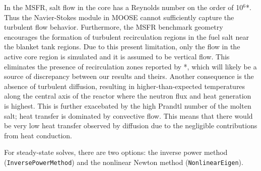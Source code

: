 In the \gls{MSFR}, salt flow in the core has a Reynolds number on the order of
10$^6$*. Thus the Navier-Stokes module in \gls{MOOSE} cannot sufficiently
capture the turbulent flow behavior. Furthermore, the \gls{MSFR} benchmark
geometry encourages the formation of turbulent recirculation regions in the
fuel salt near the blanket tank regions. Due to this present limitation, only
the flow in the active core region is simulated and it is assumed to be
vertical flow. This eliminates the presence of recirculation zones reported by
*, which will likely be a source of discrepancy between our results and
theirs. Another consequence is the absence of turbulent diffusion, resulting
in higher-than-expected temperatures along the central axis of the reactor
where the neutron flux and heat generation is highest. This is further
exacebated by the high Prandtl number of the molten salt; heat transfer is
dominated by convective flow. This means that there would be very low heat
transfer observed by diffusion due to the negligible contributions from
heat conduction.

For steady-state solves, there are two options: the inverse power
method (\texttt{InversePowerMethod}) and the nonlinear Newton method
(\texttt{NonlinearEigen}). 
